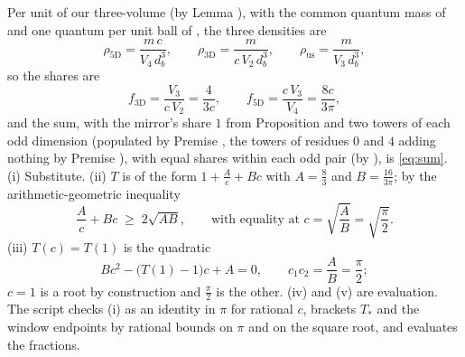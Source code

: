 Per unit of our three-volume (by Lemma ), with the common quantum mass of  and one quantum per unit ball of , the three densities are
\[
\rho_{5\mathrm{D}} = \frac{m\,c}{V_{4}\,d_{b}^{3}}, \qquad
\rho_{3\mathrm{D}} = \frac{m}{c\,V_{2}\,d_{b}^{3}}, \qquad
\rho_{\mathrm{us}} = \frac{m}{V_{3}\,d_{b}^{3}},
\]
so the shares are
\[
f_{3\mathrm{D}} = \frac{V_{3}}{c\,V_{2}} = \frac{4}{3c}, \qquad f_{5\mathrm{D}} = \frac{c\,V_{3}}{V_{4}} = \frac{8c}{3\pi},
\]
and the sum, with the mirror's share $1$ from Proposition  and two towers of each odd dimension (populated by Premise , the towers of residues $0$ and $4$ adding nothing by Premise ), with equal shares within each odd pair (by ), is \eqref{eq:sum}. (i) Substitute. (ii) $T$ is of the form $1 + \frac{A}{c} + Bc$ with $A = \frac{8}{3}$ and $B = \frac{16}{3\pi}$; by the arithmetic-geometric inequality
\[
\frac{A}{c} + Bc \;\geq\; 2\sqrt{AB}, \qquad \text{with equality at } c = \sqrt{\frac{A}{B}} = \sqrt{\frac{\pi}{2}} .
\]
(iii) $T(c) = T(1)$ is the quadratic
\[
Bc^{2} - \bigl(T(1) - 1\bigr)c + A = 0, \qquad c_{1}c_{2} = \frac{A}{B} = \frac{\pi}{2};
\]
$c = 1$ is a root by construction and $\frac{\pi}{2}$ is the other. (iv) and (v) are evaluation. The script checks (i) as an identity in $\pi$ for rational $c$, brackets $T_{\ast}$ and the window endpoints by rational bounds on $\pi$ and on the square root, and evaluates the fractions.
